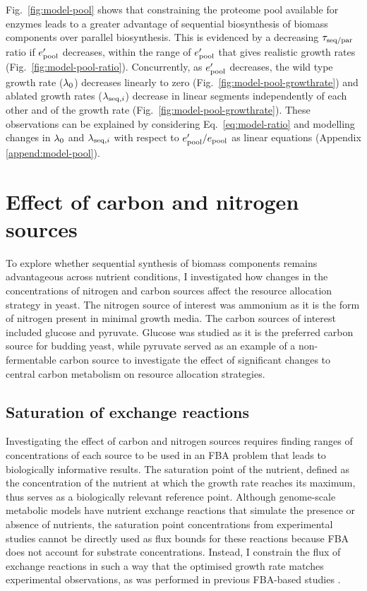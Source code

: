 
Fig.\ \ref{fig:model-pool} shows that constraining the proteome pool available for enzymes leads to a greater advantage of sequential biosynthesis of biomass components over parallel biosynthesis.
This is evidenced by a decreasing $\tau_{\mathrm{seq}/\mathrm{par}}$ ratio if $e_{\mathrm{pool}}^{\prime}$ decreases, within the range of $e_{\mathrm{pool}}^{\prime}$ that gives realistic growth rates (Fig.\ \ref{fig:model-pool-ratio}).
Concurrently, as $e_{\mathrm{pool}}^{\prime}$ decreases, the wild type growth rate ($\lambda_{0}$) decreases linearly to zero (Fig.\ \ref{fig:model-pool-growthrate}) and ablated growth rates ($\lambda_{\mathrm{seq},i}$) decrease in linear segments independently of each other and of the growth rate (Fig.\ \ref{fig:model-pool-growthrate}).
These observations can be explained by considering Eq.\ \ref{eq:model-ratio} and modelling changes in $\lambda_{0}$ and $\lambda_{\mathrm{seq},i}$ with respect to $e_{\mathrm{pool}}^{\prime}/e_{\mathrm{pool}}$ as linear equations (Appendix \ref{append:model-pool}).


\section{Effect of carbon and nitrogen sources}
\label{sec:model-exchange}

To explore whether sequential synthesis of biomass components remains advantageous across nutrient conditions, I investigated how changes in the concentrations of nitrogen and carbon sources affect the resource allocation strategy in yeast.
The nitrogen source of interest was ammonium as it is the form of nitrogen present in minimal growth media.
The carbon sources of interest included glucose and pyruvate.
Glucose was studied as it is the preferred carbon source for budding yeast, while pyruvate served as an example of a non-fermentable carbon source to investigate the effect of significant changes to central carbon metabolism on resource allocation strategies.

\subsection{Saturation of exchange reactions}
\label{subsec:model-saturation}

Investigating the effect of carbon and nitrogen sources requires finding ranges of concentrations of each source to be used in an FBA problem that leads to biologically informative results.
The saturation point of the nutrient, defined as the concentration of the nutrient at which the growth rate reaches its maximum, thus serves as a biologically relevant reference point.
Although genome-scale metabolic models have nutrient exchange reactions that simulate the presence or absence of nutrients, the saturation point concentrations from experimental studies cannot be directly used as flux bounds for these reactions because FBA does not account for substrate concentrations.
Instead, I constrain the flux of exchange reactions in such a way that the optimised growth rate matches experimental observations, as was performed in previous FBA-based studies \parencite{elsemmanWholecellModelingYeast2022}.


